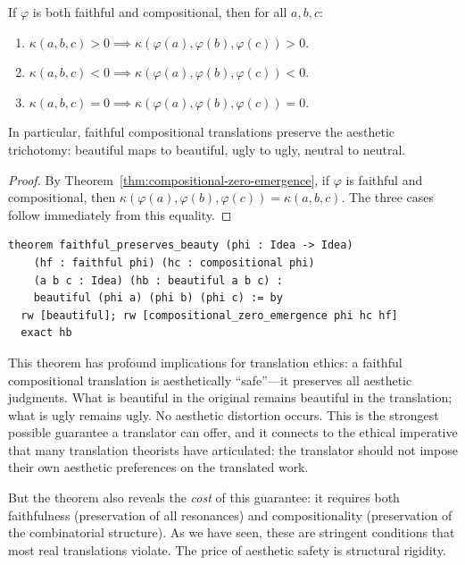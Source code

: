 \begin{theorem}
\label{thm:faithful-preserves-sign}
If $\varphi$ is both faithful and compositional, then for all $a, b, c$:
\begin{enumerate}
  \item[(i)] $\kappa(a, b, c) > 0 \implies
    \kappa(\varphi(a), \varphi(b), \varphi(c)) > 0$.
  \item[(ii)] $\kappa(a, b, c) < 0 \implies
    \kappa(\varphi(a), \varphi(b), \varphi(c)) < 0$.
  \item[(iii)] $\kappa(a, b, c) = 0 \implies
    \kappa(\varphi(a), \varphi(b), \varphi(c)) = 0$.
\end{enumerate}
In particular, faithful compositional translations preserve the aesthetic
trichotomy: beautiful maps to beautiful, ugly to ugly, neutral to neutral.
\end{theorem}

\begin{proof}
By Theorem~\ref{thm:compositional-zero-emergence}, if $\varphi$ is faithful
and compositional, then $\kappa(\varphi(a), \varphi(b), \varphi(c)) =
\kappa(a, b, c)$.  The three cases follow immediately from this equality.
\end{proof}

\begin{lstlisting}
theorem faithful_preserves_beauty (phi : Idea -> Idea)
    (hf : faithful phi) (hc : compositional phi)
    (a b c : Idea) (hb : beautiful a b c) :
    beautiful (phi a) (phi b) (phi c) := by
  rw [beautiful]; rw [compositional_zero_emergence phi hc hf]
  exact hb
\end{lstlisting}

\begin{interpretation}
\label{int:faithful-sign}
This theorem has profound implications for translation ethics: a faithful
compositional translation is aesthetically ``safe''---it preserves all
aesthetic judgments.  What is beautiful in the original remains beautiful
in the translation; what is ugly remains ugly.  No aesthetic distortion
occurs.  This is the strongest possible guarantee a translator can offer,
and it connects to the ethical imperative that many translation theorists
have articulated: the translator should not impose their own aesthetic
preferences on the translated work.

But the theorem also reveals the \emph{cost} of this guarantee: it
requires both faithfulness (preservation of all resonances) and
compositionality (preservation of the combinatorial structure).  As we
have seen, these are stringent conditions that most real translations
violate.  The price of aesthetic safety is structural rigidity.
\end{interpretation}


